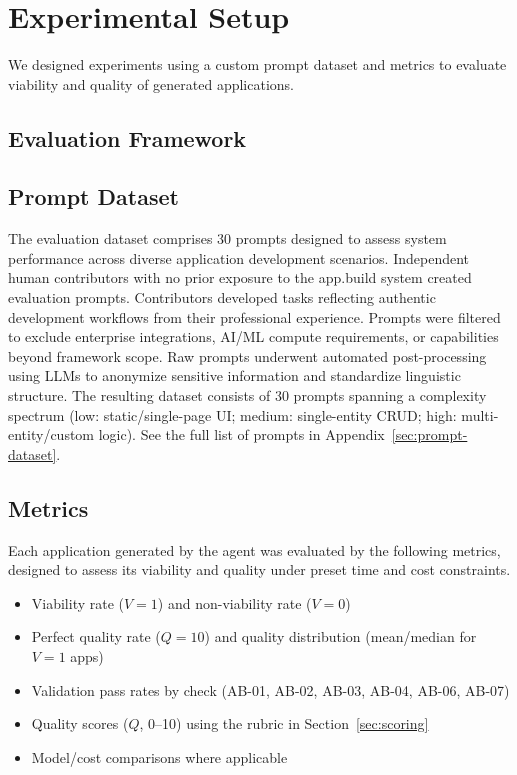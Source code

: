 \documentclass{article}
\begin{document}
\section{Experimental Setup}
\label{sec:experimental-setup}

We designed experiments using a custom prompt dataset and metrics to evaluate viability and quality of generated applications.

\subsection{Evaluation Framework}

\subsection{Prompt Dataset}
\label{sec:prompt-dataset-desc}

The evaluation dataset comprises 30 prompts designed to assess system performance across diverse application development scenarios. Independent human contributors with no prior exposure to the app.build system created evaluation prompts. Contributors developed tasks reflecting authentic development workflows from their professional experience. Prompts were filtered to exclude enterprise integrations, AI/ML compute requirements, or capabilities beyond framework scope. Raw prompts underwent automated post-processing using LLMs to anonymize sensitive information and standardize linguistic structure.
The resulting dataset consists of 30 prompts spanning a complexity spectrum (low: static/single-page UI; medium: single-entity CRUD; high: multi-entity/custom logic).
See the full list of prompts in Appendix~\ref{sec:prompt-dataset}.

\subsection{Metrics}

Each application generated by the agent was evaluated by the following metrics, designed to assess its viability and quality under preset time and cost constraints.

\begin{itemize}
\item Viability rate ($V=1$) and non-viability rate ($V=0$)
\item Perfect quality rate ($Q=10$) and quality distribution (mean/median for $V=1$ apps)
\item Validation pass rates by check (AB-01, AB-02, AB-03, AB-04, AB-06, AB-07)
\item Quality scores ($Q$, 0--10) using the rubric in Section~\ref{sec:scoring}
\item Model/cost comparisons where applicable
\end{itemize}
\end{document}
